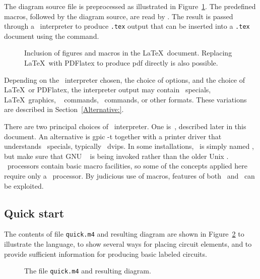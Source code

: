 The diagram source file is preprocessed as illustrated in
Figure~\ref{Flowdiag}.  The predefined macros, followed by the diagram
source, are read by \Mfour.  The result is passed through a
\pic\ interpreter to produce {\tt .tex} output that can be inserted
into a {\tt .tex} document using the \verb|| command.

\begin{figure}[hbt]
   
   \caption{Inclusion of figures and macros in the \LaTeX\ document.
   Replacing \LaTeX\ with PDFlatex to produce pdf directly is also possible.}
   \label{Flowdiag}
   \end{figure}

\noindent
Depending on the \pic\ interpreter chosen, the choice of options,
and the choice of \LaTeX\ or PDFlatex, the
interpreter output may contain \tpic\ specials, \LaTeX\ graphics,
\PSTricks~\cite{pstricks} commands, \TPGF\ commands, or other formats.
These variations are described in Section~\ref{Alternative:}.

There are two principal choices of \pic\ interpreter.  One is~\dpic,
described later in this document.  An alternative \cite{gpic} is {\bq
gpic -t} together with a printer driver that understands \tpic\ 
specials, typically~\cite{dvips} {\bq dvips}.  In some installations,
\gpic\ is simply named \pic, but make sure that GNU \pic~\cite{gpic}
is being invoked rather than the older Unix \pic.
\Pic\ processors contain basic macro facilities, so some of the
concepts applied here require only a \pic\ processor.
%
By judicious use of macros, features of both \Mfour\ and \pic\ can be
exploited.
\iffalse
The fastidious reader might observe that there are three
languages being scrambled: \Mfour, \pic, and the \tpic, \TeX\ 
or other output, not to mention the meta-language of the macros, and
that this mixture might be a problem, but experience implies otherwise.
\fi

\subsection{Quick start}\label{Quickstart:}
The contents of file {\tt quick.m4} and resulting diagram are shown in
Figure~\ref{quick} to illustrate the language, to show several ways for
placing circuit elements, and to provide sufficient information for producing
basic labeled circuits.
\begin{figure}[hbt]
   \parbox{\textwidth}{\small}%
   \hfill\llap{\raise-1.15in\hbox{ }}
   \vspace*{-\baselineskip}
   \caption{The file {\tt quick.m4} and resulting diagram.}
   \label{quick}
   \end{figure}

